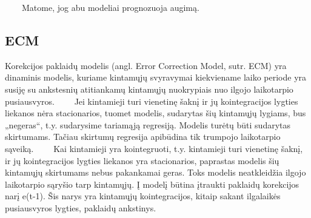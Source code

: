 \documentclass[12pt,a4paper]{article}
\theoremstyle{change}\newtheorem{salyga}{Uždavinys}
\begin{document}
\vskip 8pt  
$\qquad$Matome, jog abu modeliai prognozuoja augimą. 
     
     
     
     
     
     
     
\subsection{ECM}  
\medskip
\hspace{40pt}Korekcijos paklaidų modelis (angl. Error Correction Model, sutr. ECM) yra dinaminis modelis, kuriame kintamųjų svyravymai kiekviename laiko periode yra susiję su ankstesnių atitiankamų kintamųjų nuokrypiais nuo ilgojo laikotarpio pusiausvyros. 
\vskip 8pt  
$\qquad$Jei kintamieji turi vienetinę šaknį ir jų kointegracijos lygties liekanos nėra stacionarios, tuomet modelis, sudarytas šių kintamųjų lygiams, bus „negeras“, t.y. sudarysime tariamąją regresiją. Modelis turėtų būti sudarytas skirtumams. Tačiau skirtumų regresija apibūdina tik trumpojo laikotarpio sąveiką. 
\vskip 8pt  
$\qquad$Kai kintamieji yra kointegruoti, t.y. kintamieji turi vienetinę šaknį, ir jų kointegracijos lygties liekanos yra stacionarios, paprastas modelis šių kintamųjų skirtumams nebus pakankamai geras. Toks modelis neatkleidžia ilgojo laikotarpio sąryšio tarp kintamųjų. Į modelį būtina įtraukti paklaidų korekcijos narį e(t-1). Šis narys yra kintamųjų kointegracijos, kitaip sakant ilgalaikės pusiausvyros  lygties, paklaidų ankstinys. 
\vskip 8pt   
     
\end{document}
